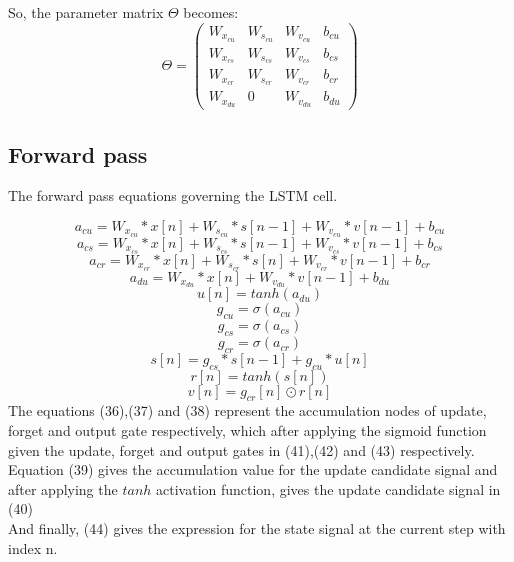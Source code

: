 \documentclass[12pt,letterpaper]{article}
\begin{document}
So, the parameter matrix $\Theta$ becomes:
\[
\Theta = \begin{pmatrix}
          W_{x_{cu}} & W_{s_{cu}} & W_{v_{cu}} & b_{cu}\\
          W_{x_{cs}} & W_{s_{cs}} & W_{v_{cs}} & b_{cs}\\
          W_{x_{cr}} & W_{s_{cr}} & W_{v_{cr}} & b_{cr}\\
          W_{x_{du}} & 0 & W_{v_{du}} & b_{du}
          \end{pmatrix}\tag{35}
\]
\subsection{Forward pass}
The forward pass equations governing the LSTM cell.

\[    
a_{cu} = W_{x_{cu}}*x[n] + W_{s_{cu}}*s[n-1] + W_{v_{cu}}*v[n-1] + b_{cu} \tag{36}
\]
\[
a_{cs} = W_{x_{cs}}*x[n] + W_{s_{cs}}*s[n-1] + W_{v_{cs}}*v[n-1] + b_{cs} \tag{37}
\]
\[
a_{cr} = W_{x_{cr}}*x[n] + W_{s_{cr}}*s[n] + W_{v_{cr}}*v[n-1] + b_{cr}   \tag{38}
\]
\[
a_{du} = W_{x_{du}}*x[n]  + W_{v_{du}}*v[n-1] + b_{du}\tag{39}
\]
\[
u[n] = tanh(a_{du}) \tag{40}
\]
\[
g_{cu} = \sigma(a_{cu})\tag{41}
\]
\[
g_{cs} = \sigma(a_{cs})\tag{42}
\]
\[
g_{cr} = \sigma(a_{cr})\tag{43}
\]
\[
s[n] = g_{cs}*s[n-1]+g_{cu}*u[n]\tag{44}
\]
\[
r[n] = tanh(s[n])\tag{45}
\]
\[
v[n] = g_{cr}[n]\odot r[n]\tag{46}
\]
The equations (36),(37) and (38) represent the accumulation nodes of update, forget and output gate respectively, which after applying the sigmoid function given the update, forget and output gates in (41),(42) and (43) respectively.
\\
Equation (39) gives the accumulation value for the update candidate signal and after applying the $tanh$ activation function, gives the update candidate signal in (40)\\
And finally, (44) gives the expression for the state signal at the current step with index n.
\end{document}
